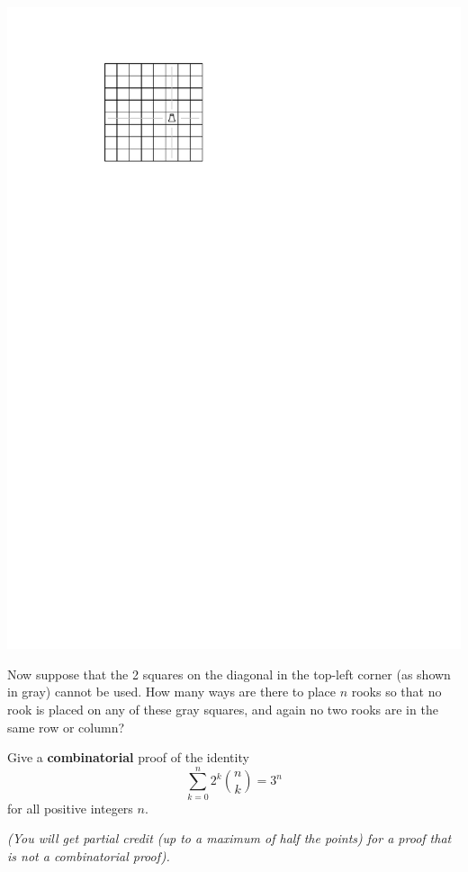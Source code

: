 \documentclass[12pt]{article}
\begin{document}
\begin{problem}{12}
        \newpage
    \begin{center}
        \includegraphics[page=2]{board}
    \end{center}

         Now suppose that the 2 squares on the diagonal in the top-left corner (as shown in gray) cannot be used.
        How many ways are there to place $n$ rooks so that no rook is placed on any of these gray squares, and again no two rooks are in the same row or column?



        \eparts
\end{problem}

\newpage

\begin{problem}{10}
    Give a \textbf{combinatorial} proof of the identity
\[ \sum_{k=0}^n 2^k {n \choose k} = 3^n \]
for all positive integers $n$.

\emph{(You will get partial credit (up to a maximum of half the points) for a proof that is not a combinatorial proof).}
\end{problem}
\end{document}

